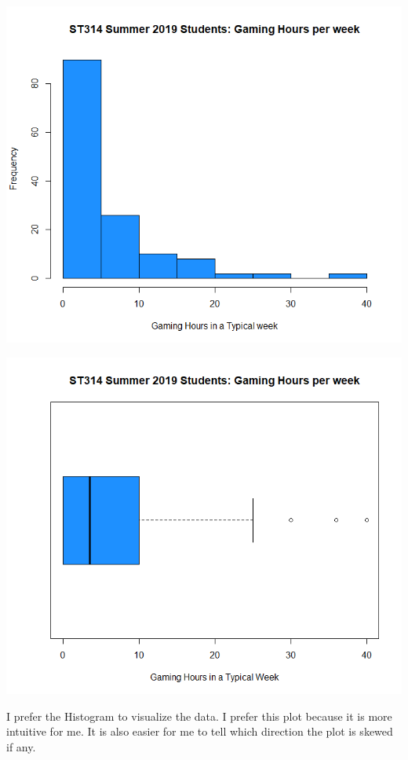 \documentclass[letterpaper, onecolumn,10pt]{IEEEtran}
\begin{document}
                \includegraphics[width=\textwidth]{week3/Images/Histogram.png}
                
                \includegraphics[width=\textwidth]{week3/Images/BoxPlot.png}
                
                I prefer the Histogram to visualize the data. I prefer this plot because it is more intuitive for me. It is also easier for me to tell which direction the plot is skewed if any. 
                
\end{document}
